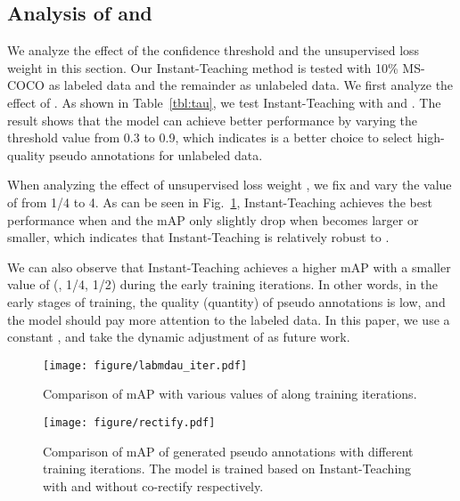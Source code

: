 \documentclass[final]{cvpr}
\begin{document}
\subsection{Analysis of  and }

We analyze the effect of the confidence threshold  and the unsupervised loss weight  in this section. Our Instant-Teaching method is tested with 10\% MS-COCO as labeled data and the remainder as unlabeled data. We first analyze the effect of . As shown in Table~\ref{tbl:tau}, we test Instant-Teaching with  and . The result shows that the model can achieve better performance by varying the threshold value  from 0.3 to 0.9, which indicates  is a better choice to select high-quality pseudo annotations for unlabeled data.

When analyzing the effect of unsupervised loss weight , we fix  and vary the value of  from 1/4 to 4. 
As can be seen in Fig.~\ref{fig:lambda_u}, Instant-Teaching achieves the best performance when  and the mAP only slightly drop when  becomes larger or smaller, which indicates that Instant-Teaching is 
relatively robust to . 

We can also observe that Instant-Teaching achieves a higher mAP with a smaller value of  (\eg, 1/4, 1/2) during the early training iterations.
In other words, in the early stages of training, the quality (quantity) of pseudo annotations is low, and the model should pay more attention to the labeled data. In this paper, we use a constant , and take the dynamic adjustment of  as future work.


\begin{figure}[t!]
	\begin{center}
	\texttt{[image: figure/labmdau\_iter.pdf]}
	\end{center}
	\vspace{-.1in}
	\caption{Comparison of mAP with various values of  along training iterations.}
	\label{fig:lambda_u}
	\vspace{-.15in}
\end{figure}

\begin{figure}[t!]
	\begin{center}
	\texttt{[image: figure/rectify.pdf]}
	\end{center}
	\vspace{-.1in}
	\caption{Comparison of mAP of generated pseudo annotations with different training iterations. The model is trained based on Instant-Teaching with and without co-rectify respectively.}
	\label{fig:rectify_map}
	\vspace{-.15in}
\end{figure}
\end{document}
